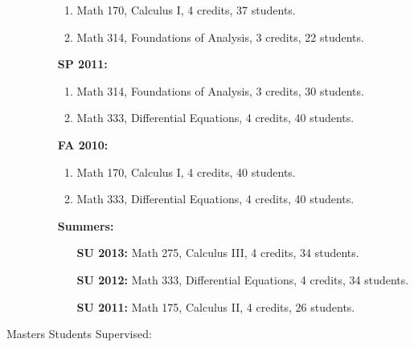 \begin{description}
\begin{enumerate}
\begin{enumerate}
\item  Math 170, Calculus I, 4 credits, 37 students.

\item   Math 314, Foundations of Analysis, 3 credits, 22 students.

\end{enumerate}

\item[\bf SP 2011:]

\begin{enumerate}

\item  Math 314, Foundations of Analysis, 3 credits, 30 students.

\item  Math 333, Differential Equations, 4 credits, 40 students.

\end{enumerate}

\item[\bf FA 2010:]

\begin{enumerate}

\item  Math 170, Calculus I, 4 credits, 40 students.

\item  Math 333, Differential Equations, 4 credits, 40 students.

\end{enumerate}

\item[\bf Summers:]  

\begin{enumerate} \item[]

\item[\bf SU 2013:]   Math 275, Calculus III, 4 credits, 34 students.

\item[\bf SU 2012:]  Math 333, Differential Equations, 4 credits, 34 students.

\item[\bf SU 2011:]  Math 175, Calculus II, 4 credits, 26 students.

\end{enumerate}

\end{enumerate}

\item[Masters Students Supervised:]

\begin{description}


\end{description}
\end{description}
